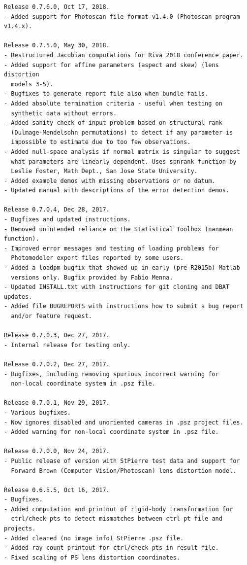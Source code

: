 \documentclass{article}
\begin{document}
\begin{verbatim}
Release 0.7.6.0, Oct 17, 2018.
- Added support for Photoscan file format v1.4.0 (Photoscan program v1.4.x).

Release 0.7.5.0, May 30, 2018.
- Restructured Jacobian computations for Riva 2018 conference paper.
- Added support for affine parameters (aspect and skew) (lens distortion
  models 3-5).
- Bugfixes to generate report file also when bundle fails.
- Added absolute termination criteria - useful when testing on
  synthetic data without errors.
- Added sanity check of input problem based on structural rank
  (Dulmage-Mendelsohn permutations) to detect if any parameter is
  impossible to estimate due to too few observations.
- Added null-space analysis if normal matrix is singular to suggest
  what parameters are linearly dependent. Uses spnrank function by
  Leslie Foster, Math Dept., San Jose State University.
- Added example demos with missing observations or no datum.
- Updated manual with descriptions of the error detection demos.

Release 0.7.0.4, Dec 28, 2017.
- Bugfixes and updated instructions.
- Removed unintended reliance on the Statistical Toolbox (nanmean function).
- Improved error messages and testing of loading problems for
  Photomodeler export files reported by some users.
- Added a loadpm bugfix that showed up in early (pre-R2015b) Matlab
  versions only. Bugfix provided by Fabio Menna.
- Updated INSTALL.txt with instructions for git cloning and DBAT updates.
- Added file BUGREPORTS with instructions how to submit a bug report
  and/or feature request.

Release 0.7.0.3, Dec 27, 2017.
- Internal release for testing only.

Release 0.7.0.2, Dec 27, 2017.
- Bugfixes, including removing spurious incorrect warning for
  non-local coordinate system in .psz file.

Release 0.7.0.1, Nov 29, 2017.
- Various bugfixes.
- Now ignores disabled and unoriented cameras in .psz project files.
- Added warning for non-local coordinate system in .psz file.

Release 0.7.0.0, Nov 24, 2017.
- Public release of version with StPierre test data and support for
  Forward Brown (Computer Vision/Photoscan) lens distortion model.

Release 0.6.5.5, Oct 16, 2017.
- Bugfixes.
- Added computation and printout of rigid-body transformation for
  ctrl/check pts to detect mismatches between ctrl pt file and projects.
- Added cleaned (no image info) StPierre .psz file.
- Added ray count printout for ctrl/check pts in result file.
- Fixed scaling of PS lens distortion coordinates.


\end{verbatim}
\end{document}
